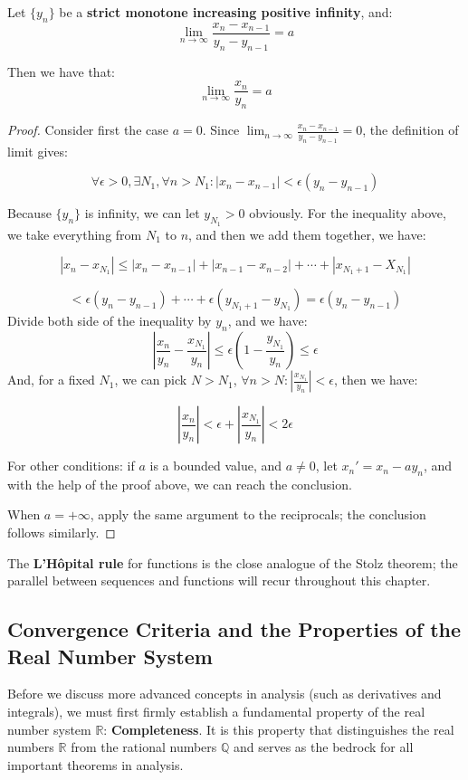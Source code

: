 \begin{theorem}
Let $\{y_n\}$ be a \textbf{strict monotone increasing positive infinity}, and:
\[
\lim_{n \to \infty} \frac{x_n -x_{n-1}}{y_n-y_{n-1}}=a
\]

Then we have that:
\[\lim_{n \to \infty}\frac{x_n}{y_n}=a\]

\end{theorem}

\begin{proof}
Consider first the case $a=0$.
Since $\lim_{n \to \infty} \frac{x_n -x_{n-1}}{y_n-y_{n-1}}=0$, the definition of limit gives:

\[
\forall\epsilon > 0, \exists N_1,\forall n> N_1:|x_n-x_{n-1}|<\epsilon(y_n-y_{n-1})
\]

Because $\{y_n\}$ is infinity, we can let $y_{N_1} > 0$ obviously. For the inequality above, we take everything from $N_1$ to $n$, and then we add them together, we have:

\[
|x_n-x_{N_1}|\leq |x_n-x_{n-1}| +|x_{n-1}-x_{n-2}|+\cdots+ |x_{N_1+1}-X_{N_1}|
\]

\[
 < \epsilon (y_n-y_{n-1}) + \cdots + \epsilon (y_{N_1+1}-y_{N_1}) = \epsilon (y_n-y_{n-1})
\]
Divide both side of the inequality by $y_n$, and we have:
\[
|\frac{x_n}{y_n}-\frac{x_{N_1}}{y_n}|\leq \epsilon (1-\frac{y_{N_1}}{y_n}) \leq \epsilon
\]
And, for a fixed $N_1$, we can pick $N>N_1$, $\forall n >N: |\frac{x_{N_1}}{y_n}|<\epsilon$, then we have:

\[
|\frac{x_n}{y_n}|<\epsilon+|\frac{x_{N_1}}{y_n}|<2\epsilon
\]

For other conditions: if $a$ is a bounded value, and $a \neq 0$, let ${x_n}'=x_n-ay_n$, and with the help of the proof above, we can reach the conclusion.

When $a=+\infty$, apply the same argument to the reciprocals; the conclusion follows similarly.

\end{proof}

The \textbf{L'Hôpital rule} for functions is the close analogue of the Stolz theorem; the parallel between sequences and functions will recur throughout this chapter.


\subsection{Convergence Criteria and the Properties of the Real Number System}

Before we discuss more advanced concepts in analysis (such as derivatives and integrals), we must first firmly establish a fundamental property of the real number system $\mathbb{R}$: \textbf{Completeness}. It is this property that distinguishes the real numbers $\mathbb{R}$ from the rational numbers $\mathbb{Q}$ and serves as the bedrock for all important theorems in analysis.

